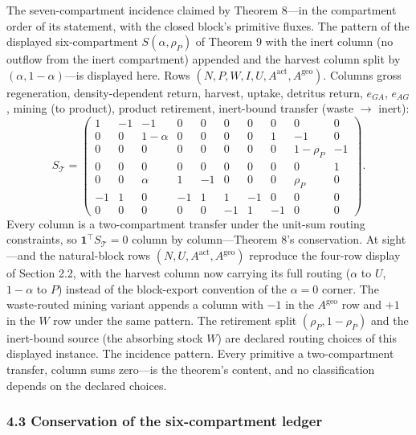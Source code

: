 \documentclass[11pt]{article}
\begin{document}
The seven-compartment incidence claimed by Theorem 8---in the compartment order of its statement, with the closed block's primitive fluxes. The pattern of the displayed six-compartment \(S(\alpha, \rho_P)\) of Theorem 9 with the inert column (no outflow from the inert compartment) appended and the harvest column split by \((\alpha, 1-\alpha)\)---is displayed here. Rows \((N, P, W, I, U, A^{\mathrm{act}}, A^{\mathrm{geo}})\). Columns gross regeneration, density-dependent return, harvest, uptake, detritus return, \(e_{GA}\), \(e_{AG}\), mining (to product), product retirement, inert-bound transfer (waste \(\to\) inert): \[S_{\mathcal{T}} =
\begin{pmatrix}
1 & -1 & -1 & 0 & 0 & 0 & 0 & 0 & 0 & 0 \\
0 & 0 & 1-\alpha & 0 & 0 & 0 & 0 & 1 & -1 & 0 \\
0 & 0 & 0 & 0 & 0 & 0 & 0 & 0 & 1-\rho_P & -1 \\
0 & 0 & 0 & 0 & 0 & 0 & 0 & 0 & 0 & 1 \\
0 & 0 & \alpha & 1 & -1 & 0 & 0 & 0 & \rho_P & 0 \\
-1 & 1 & 0 & -1 & 1 & 1 & -1 & 0 & 0 & 0 \\
0 & 0 & 0 & 0 & 0 & -1 & 1 & -1 & 0 & 0
\end{pmatrix}.\] Every column is a two-compartment transfer under the unit-sum routing constraints, so \(\mathbf{1}^\top S_{\mathcal{T}} = 0\) column by column---Theorem 8's conservation. At sight---and the natural-block rows \((N, U, A^{\mathrm{act}}, A^{\mathrm{geo}})\) reproduce the four-row display of Section 2.2, with the harvest column now carrying its full routing (\(\alpha\) to \(U\), \(1-\alpha\) to \(P\)) instead of the block-export convention of the \(\alpha = 0\) corner. The waste-routed mining variant appends a column with \(-1\) in the \(A^{\mathrm{geo}}\) row and \(+1\) in the \(W\) row under the same pattern. The retirement split \((\rho_P, 1-\rho_P)\) and the inert-bound source (the absorbing stock \(W\)) are declared routing choices of this displayed instance. The incidence pattern. Every primitive a two-compartment transfer, column sums zero---is the theorem's content, and no classification depends on the declared choices.

\subsubsection{4.3 Conservation of the six-compartment
ledger}\label{conservation-of-the-six-compartment-ledger}
\end{document}
